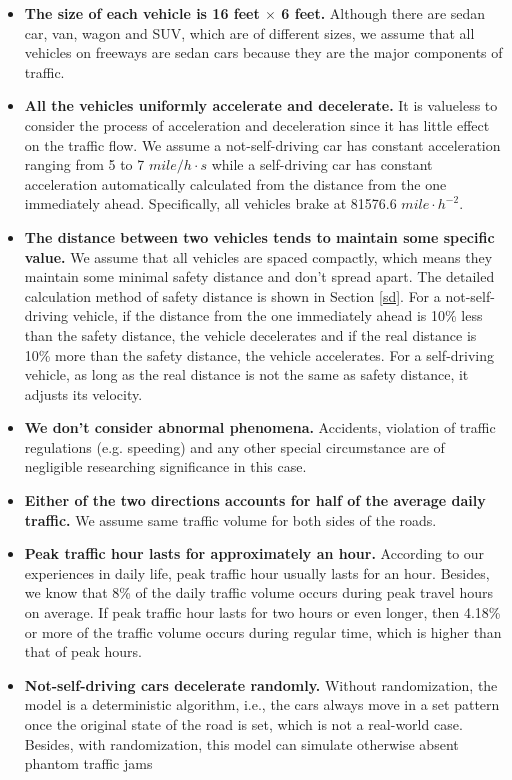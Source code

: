 \documentclass[a4paper]{article}
\begin{document}
	\begin{itemize}
		\item \textbf{The size of each vehicle is 16 feet $\times$ 6 feet.} Although there are sedan car, van, wagon and SUV, which are of different sizes, we assume that all vehicles on freeways are sedan cars because they are the major components of traffic.
		\item \textbf{All the vehicles uniformly accelerate and decelerate.} It is valueless to consider the process of acceleration and deceleration since it has little effect on the traffic flow. We assume a not-self-driving car has constant acceleration ranging from 5 to 7 $mile/h\cdot s$ while a self-driving car has constant acceleration automatically calculated from the distance from the one immediately ahead. Specifically, all vehicles brake at 81576.6 $mile\cdot h^{-2}$. 
		\item \textbf{The distance between two vehicles tends to maintain some specific value.} We assume that all vehicles are spaced compactly, which means they maintain some minimal safety distance and don’t spread apart. The detailed calculation method of safety distance is shown in Section \ref{sd}. For a not-self-driving vehicle, if the distance from the one immediately ahead is 10\% less than the safety distance, the vehicle decelerates and if the real distance is 10\% more than the safety distance, the vehicle accelerates. For a self-driving vehicle, as long as the real distance is not the same as safety distance, it adjusts its velocity. 
		\item \textbf{We don’t consider abnormal phenomena.} Accidents, violation of traffic regulations (e.g. speeding) and any other special circumstance are of negligible researching significance in this case.
		\item \textbf{Either of the two directions accounts for half of the average daily traffic.} We assume same traffic volume for both sides of the roads.
		\item \textbf{Peak traffic hour lasts for approximately an hour.}  According to our experiences in daily life, peak traffic hour usually lasts for an hour. Besides, we know that 8\% of the daily traffic volume occurs during peak travel hours on average. If peak traffic hour lasts for two hours or even longer, then 4.18\% or more of the traffic volume occurs during regular time, which is higher than that of peak hours.
		\item \textbf{Not-self-driving cars decelerate randomly.} Without randomization, the model is a deterministic algorithm, i.e., the cars always move in a set pattern once the original state of the road is set, which is not a real-world case. Besides, with randomization, this model can simulate otherwise absent phantom traffic jams \footnotemark {}
\end{itemize}
\end{document}
